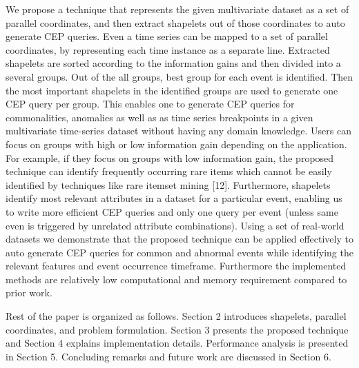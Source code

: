\documentclass[conference]{IEEEtran}  %
\begin{document}
We propose a technique that represents the given multivariate dataset as a set of parallel coordinates, and then extract shapelets out of those coordinates to auto generate CEP queries. Even a time series can be mapped to a set of parallel coordinates, by representing each time instance as a separate line. Extracted shapelets are sorted according to the information gains and then divided into a several groups. Out of the all groups, best group for each event is identified. Then the most important shapelets in the identified groups are used to generate one CEP query per group. This enables one to generate CEP queries for commonalities, anomalies as well as as time series breakpoints in a given multivariate time-series dataset without having any domain knowledge. Users can focus on groups with high or low information gain depending on the application. For example, if they focus on groups with low information gain, the proposed technique can identify frequently occurring rare items which cannot be easily identified by techniques like rare itemset mining [12]. Furthermore, shapelets identify most relevant attributes in a dataset for a particular event, enabling us to write more efficient CEP queries and only one query per event (unless same even is triggered by unrelated attribute combinations). Using a set of real-world datasets we demonstrate that the proposed technique can be applied effectively to auto generate CEP queries for common and abnormal events while identifying the relevant features and event occurrence timeframe. Furthermore the implemented methods are relatively low computational and memory requirement compared to prior work.

Rest of the paper is organized as follows. Section 2 introduces shapelets, parallel coordinates, and problem formulation. Section 3 presents the proposed technique and Section 4 explains implementation details. Performance analysis is presented in Section 5. Concluding remarks and future work are discussed in Section 6.
\end{document}
